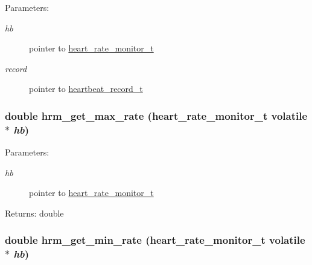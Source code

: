 \begin{Desc}
\item[Parameters:]
\begin{description}
\item[{\em hb}]pointer to \hyperlink{structheart__rate__monitor__t}{heart\_\-rate\_\-monitor\_\-t} \item[{\em record}]pointer to \hyperlink{structheartbeat__record__t}{heartbeat\_\-record\_\-t} \end{description}
\end{Desc}
\hypertarget{heart__rate__monitor-shared_8c_f7f779cd6a79780479064da8b6eb05e7}{
\subsubsection[hrm\_\-get\_\-max\_\-rate]{\setlength{\rightskip}{0pt plus 5cm}double hrm\_\-get\_\-max\_\-rate ({\bf heart\_\-rate\_\-monitor\_\-t} volatile $\ast$ {\em hb})}}
\label{heart__rate__monitor-shared_8c_f7f779cd6a79780479064da8b6eb05e7}


\begin{Desc}
\item[Parameters:]
\begin{description}
\item[{\em hb}]pointer to \hyperlink{structheart__rate__monitor__t}{heart\_\-rate\_\-monitor\_\-t} \end{description}
\end{Desc}
\begin{Desc}
\item[Returns:]double \end{Desc}
\hypertarget{heart__rate__monitor-shared_8c_d0ea463faa51e1bf20b3f5efbc4c91c3}{
\subsubsection[hrm\_\-get\_\-min\_\-rate]{\setlength{\rightskip}{0pt plus 5cm}double hrm\_\-get\_\-min\_\-rate ({\bf heart\_\-rate\_\-monitor\_\-t} volatile $\ast$ {\em hb})}}
\label{heart__rate__monitor-shared_8c_d0ea463faa51e1bf20b3f5efbc4c91c3}



